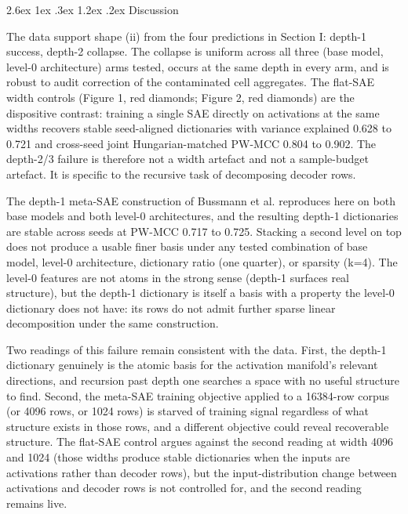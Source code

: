 \documentclass[conference]{IEEEtran}
\makeatletter
\renewcommand\section{\@startsection{section}{1}{\z@}%
   {2.6ex \@plus 1ex \@minus .3ex}%
   {1.2ex \@plus .2ex}%
   {\normalfont\Large\bfseries\centering}}
\makeatother
\begin{document}
\hypertarget{discussion}{%
\section{Discussion}\label{discussion}}

The data support shape (ii) from the four predictions in Section I:
depth-1 success, depth-2 collapse. The collapse is uniform across all
three (base model, level-0 architecture) arms tested, occurs at the same
depth in every arm, and is robust to audit correction of the
contaminated cell aggregates. The flat-SAE width controls (Figure 1, red
diamonds; Figure 2, red diamonds) are the dispositive contrast: training
a single SAE directly on activations at the same widths recovers stable
seed-aligned dictionaries with variance explained 0.628 to 0.721 and
cross-seed joint Hungarian-matched PW-MCC 0.804 to 0.902. The depth-2/3
failure is therefore not a width artefact and not a sample-budget
artefact. It is specific to the recursive task of decomposing decoder
rows.

The depth-1 meta-SAE construction of Bussmann et al.
\autocite{bussmann2024showingsaeslearn} reproduces here on both base
models and both level-0 architectures, and the resulting depth-1
dictionaries are stable across seeds at PW-MCC 0.717 to 0.725. Stacking
a second level on top does not produce a usable finer basis under any
tested combination of base model, level-0 architecture, dictionary ratio
(one quarter), or sparsity (k=4). The level-0 features are not atoms in
the strong sense (depth-1 surfaces real structure), but the depth-1
dictionary is itself a basis with a property the level-0 dictionary does
not have: its rows do not admit further sparse linear decomposition
under the same construction.

Two readings of this failure remain consistent with the data. First, the
depth-1 dictionary genuinely is the atomic basis for the activation
manifold's relevant directions, and recursion past depth one searches a
space with no useful structure to find. Second, the meta-SAE training
objective applied to a 16384-row corpus (or 4096 rows, or 1024 rows) is
starved of training signal regardless of what structure exists in those
rows, and a different objective could reveal recoverable structure. The
flat-SAE control argues against the second reading at width 4096 and
1024 (those widths produce stable dictionaries when the inputs are
activations rather than decoder rows), but the input-distribution change
between activations and decoder rows is not controlled for, and the
second reading remains live.
\end{document}
